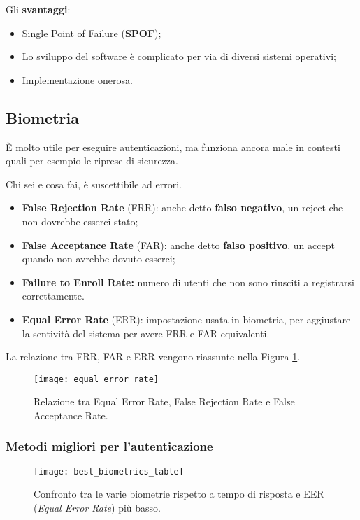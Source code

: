 Gli \textbf{svantaggi}:
\begin{itemize}
\item Single Point of Failure (\textbf{SPOF});
\item Lo sviluppo del software è complicato per via di diversi sistemi 
operativi;
\item Implementazione onerosa.
\end{itemize}

\subsection{Biometria}

È molto utile per eseguire autenticazioni, ma funziona ancora male in contesti
quali per esempio le riprese di sicurezza.

Chi sei e cosa fai, è suscettibile ad errori.

\begin{itemize}
\item \textbf{False Rejection Rate} (FRR): anche detto 
\textbf{falso negativo}, un reject che non dovrebbe esserci stato;
\item \textbf{False Acceptance Rate} (FAR): anche detto 
\textbf{falso positivo}, un accept quando non avrebbe dovuto esserci;
\item \textbf{Failure to Enroll Rate:} numero di utenti che non sono
riusciti a registrarsi correttamente.
\item \textbf{Equal Error Rate} (ERR): impostazione usata
in biometria, per aggiustare la sentività del sistema per avere
FRR e FAR equivalenti.
\end{itemize}
La relazione tra FRR, FAR e ERR vengono riassunte nella Figura 
\ref{fig:equalErrorRate}.

\begin{figure}[H]
 \centering
 \texttt{[image: equal\_error\_rate]}
 \caption{Relazione tra Equal Error Rate, False Rejection Rate e
 False Acceptance Rate.}
 \label{fig:equalErrorRate}
\end{figure}


\subsubsection{Metodi migliori per l'autenticazione}

\begin{figure}[H]
 \centering
 \texttt{[image: best\_biometrics\_table]}
 \caption{Confronto tra le varie biometrie rispetto a tempo di risposta e EER
(\emph{Equal Error Rate}) più basso. }
\end{figure}


